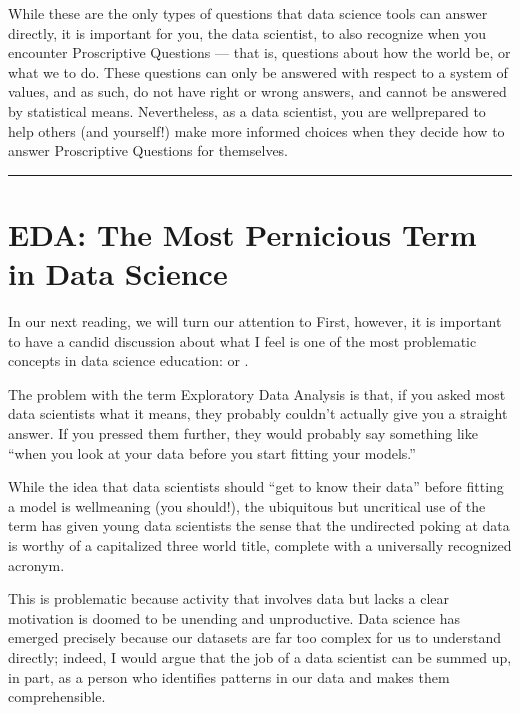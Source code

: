 \documentclass[letterpaper,10pt,english]{jupyterBook}
\begin{document}
\sphinxAtStartPar
While these are the only types of questions that data science tools can answer directly, it is important for you, the data scientist, to also recognize when you encounter Proscriptive Questions — that is, questions about how the world  be, or what we  to do. These questions can only be answered with respect to a system of values, and as such, do not have right or wrong answers, and cannot be answered by statistical means. Nevertheless, as a data scientist, you are well\sphinxhyphen{}prepared to help others (and yourself!) make more informed choices when they decide how to answer Proscriptive Questions for themselves.


\bigskip\hrule\bigskip


\sphinxstepscope


\chapter{EDA: The Most Pernicious Term in Data Science}
\label{\detokenize{30_questions/07_eda:eda-the-most-pernicious-term-in-data-science}}\label{\detokenize{30_questions/07_eda::doc}}
\sphinxAtStartPar
In our next reading, we will turn our attention to  First, however, it is important to have a candid discussion about what I feel is one of the most problematic concepts in data science education:  or .

\sphinxAtStartPar
The problem with the term Exploratory Data Analysis is that, if you asked most data scientists what it means, they probably couldn’t actually give you a straight answer. If you pressed them further, they would probably say something like “when you look at your data before you start fitting your models.”

\sphinxAtStartPar
While the idea that data scientists should “get to know their data” before fitting a model is well\sphinxhyphen{}meaning (you  should!), the ubiquitous but uncritical use of the term has given young data scientists the sense that the undirected poking at data is worthy of a capitalized three world title, complete with a universally recognized acronym.

\sphinxAtStartPar
This is problematic because  activity that involves data but lacks a clear motivation is doomed to be unending and unproductive. Data science has emerged precisely because our datasets are far too complex for us to understand directly; indeed, I would argue that the job of a data scientist can be summed up, in part, as a person who identifies  patterns in our data and makes them comprehensible.
\end{document}
